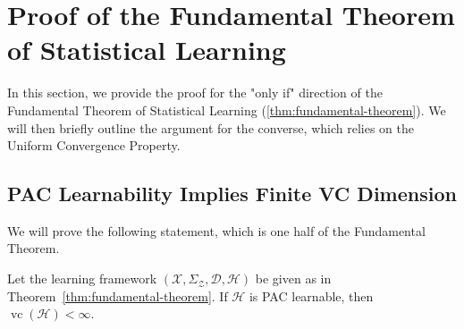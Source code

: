 \section{Proof of the Fundamental Theorem of Statistical Learning}

In this section, we provide the proof for the "only if" direction of the Fundamental Theorem of Statistical Learning (\ref{thm:fundamental-theorem}). We will then briefly outline the argument for the converse, which relies on the Uniform Convergence Property.

\subsection{PAC Learnability Implies Finite VC Dimension}

We will prove the following statement, which is one half of the Fundamental Theorem.

\begin{theorem}
    Let the learning framework $(\mathcal{X}, \Sigma_{\mathcal{Z}}, \mathcal{D}, \mathcal{H})$ be given as in Theorem~\ref{thm:fundamental-theorem}. If $\mathcal{H}$ is PAC learnable, then $\operatorname{vc}(\mathcal{H}) < \infty$.
\end{theorem}

